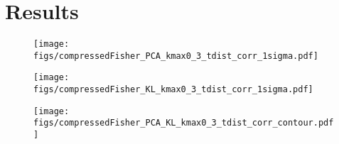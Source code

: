 \section{Results} \label{sec:results} 

\begin{figure}
\begin{center}
    \texttt{[image: figs/compressedFisher\_PCA\_kmax0\_3\_tdist\_corr\_1sigma.pdf]}
    \caption{}
\label{fig:pca}
\end{center}
\end{figure}

\begin{figure}
\begin{center}
    \texttt{[image: figs/compressedFisher\_KL\_kmax0\_3\_tdist\_corr\_1sigma.pdf]} 
    \caption{}
\label{fig:kl}
\end{center}
\end{figure}

\begin{figure}
\begin{center}
    \texttt{[image: figs/compressedFisher\_PCA\_KL\_kmax0\_3\_tdist\_corr\_contour.pdf]} 
    \caption{}
\label{fig:contour}
\end{center}
\end{figure}
